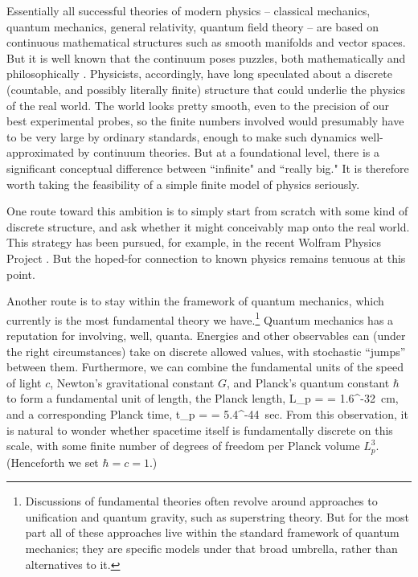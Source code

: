 \documentclass[aps,prd,nofootinbib,notitlepage,12pt]{revtex4-2}
\begin{document}
Essentially all successful theories of modern physics -- classical mechanics, quantum mechanics, general relativity, quantum field theory -- are based on continuous mathematical structures such as smooth manifolds and vector spaces.
But it is well known that the continuum poses puzzles, both mathematically and philosophically \cite{sep-infinity}.
Physicists, accordingly, have long speculated about a discrete (countable, and possibly literally finite) structure that could underlie the physics of the real world.
The world looks pretty smooth, even to the precision of our best experimental probes, so the finite numbers involved would presumably have to be very large by ordinary standards, enough to make such dynamics well-approximated by continuum theories.
But at a foundational level, there is a significant conceptual difference between ``infinite" and ``really big."
It is therefore worth taking the feasibility of a simple finite model of physics seriously.

One route toward this ambition is to simply start from scratch with some kind of discrete structure, and ask whether it might conceivably map onto the real world.
This strategy has been pursued, for example, in the recent Wolfram Physics Project \cite{wolfram2020}.
But the hoped-for connection to known physics remains tenuous at this point.

Another route is to stay within the framework of quantum mechanics, which currently is the most fundamental theory we have.\footnote{Discussions of fundamental theories often revolve around approaches to unification and quantum gravity, such as superstring theory. But for the most part all of these approaches live within the standard framework of quantum mechanics; they are specific models under that broad umbrella, rather than alternatives to it.}
Quantum mechanics has a reputation for involving, well, quanta.
Energies and other observables can (under the right circumstances) take on discrete allowed values, with stochastic ``jumps'' between them.
Furthermore, we can combine the fundamental units of the speed of light $c$, Newton's gravitational constant $G$, and Planck's quantum constant $\hbar$ to form a fundamental unit of length, the Planck length,
\be
  L_p =  = 1.6^{-32}~\textrm{cm,}
\ee
and a corresponding Planck time,
\be
  t_p =  = 5.4^{-44}~\textrm{sec.}
\ee
From this observation, it is natural to wonder whether spacetime itself is fundamentally discrete on this scale, with some finite number of degrees of freedom per Planck volume $L_p^3$. (Henceforth we set $\hbar = c = 1$.)
\end{document}

